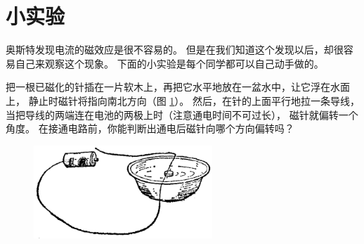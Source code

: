 \section*{小实验}

奥斯特发现电流的磁效应是很不容易的。
但是在我们知道这个发现以后，却很容易自己来观察这个现象。
下面的小实验是每个同学都可以自己动手做的。

把一根已磁化的针插在一片软木上，再把它水平地放在一盆水中，让它浮在水面上，
静止时磁针将指向南北方向（图 \ref{fig:10-27}）。 然后，在针的上面平行地拉一条导线，
当把导线的两端连在电池的两极上时（注意通电时间不可过长）， 磁针就偏转一个角度。
在接通电路前，你能判断出通电后磁针向哪个方向偏转吗？

\begin{figure}[H]%
    \centering
    \includegraphics[width=0.6\textwidth]{../pic/czwl2-ch10-27}
    \caption{}\label{fig:10-27}
\end{figure}


